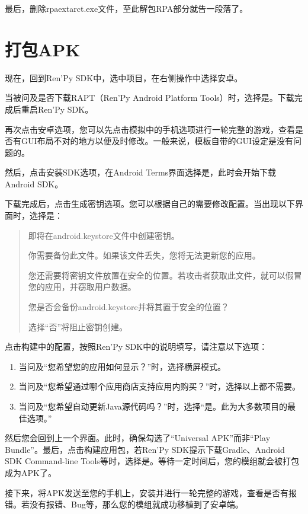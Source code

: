 \documentclass[../../Main.tex]{subfiles}
\begin{document}
最后，删除rpaextarct.exe文件，至此解包RPA部分就告一段落了。

\section{打包APK}
现在，回到Ren'Py SDK中，选中项目，在右侧操作中选择安卓。

当被问及是否下载RAPT（Ren'Py Android Platform Tools）时，选择是。下载完成后重启Ren'Py SDK。

再次点击安卓选项，您可以先点击模拟中的手机选项进行一轮完整的游戏，查看是否有GUI布局不对的地方以便及时修改。一般来说，模板自带的GUI设定是没有问题的。

然后，点击安装SDK选项，在Android Terms界面选择是，此时会开始下载Android SDK。

下载完成后，点击生成密钥选项。您可以根据自己的需要修改配置。当出现以下界面时，选择是：
\begin{quote}
    即将在android.keystore文件中创建密钥。

    你需要备份此文件。如果该文件丢失，您将无法更新您的应用。

    您还需要将密钥文件放置在安全的位置。若攻击者获取此文件，就可以假冒您的应用，并窃取用户数据。

    您是否会备份android.keystore并将其置于安全的位置？

    选择“否”将阻止密钥创建。
\end{quote}

点击构建中的配置，按照Ren'Py SDK中的说明填写，请注意以下选项：
\begin{enumerate}
    \item 当问及“您希望您的应用如何显示？”时，选择横屏模式。
    \item 当问及“您希望通过哪个应用商店支持应用内购买？”时，选择以上都不需要。
    \item 当问及“您希望自动更新Java源代码吗？”时，选择“是。此为大多数项目的最佳选项。”
\end{enumerate}

然后您会回到上一个界面。此时，确保勾选了“Universal APK”而非“Play Bundle”。最后，点击构建应用包，若Ren'Py SDK提示下载Gradle、Android SDK Command-line Tools等时，选择是。等待一定时间后，您的模组就会被打包成为APK了。

接下来，将APK发送至您的手机上，安装并进行一轮完整的游戏，查看是否有报错。若没有报错、Bug等，那么您的模组就成功移植到了安卓端。
\end{document}
